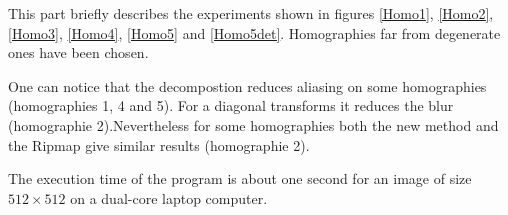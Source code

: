 

This part briefly describes the experiments shown in figures \ref{Homo1}, \ref{Homo2}, \ref{Homo3}, \ref{Homo4}, \ref{Homo5} and \ref{Homo5det}. Homographies far from degenerate ones have been chosen.



One can notice that the decompostion reduces aliasing on some homographies (homographies 1, 4 and 5). For a diagonal transforms it reduces the blur (homographie 2).Nevertheless for some homographies both the new method and the Ripmap give similar results (homographie 2). 



The execution time of the program is about one second for an image of size $512\times 512$ on a dual-core laptop computer.


